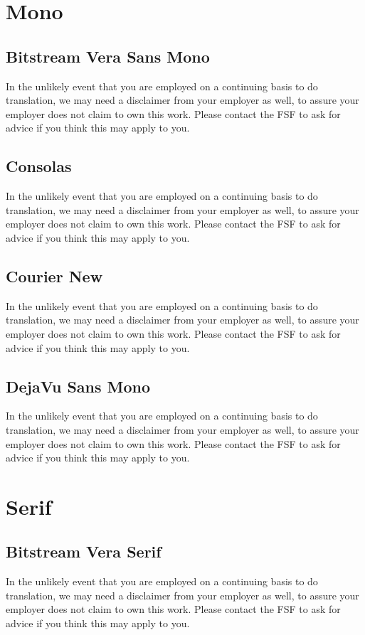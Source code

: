 \documentclass[a4paper,12pt,openany]{book}
\begin{document}
\section{Mono}
  \subsection{Bitstream Vera Sans Mono}
    In the unlikely event that you are employed on a continuing basis to do
    translation, we may need a disclaimer from your employer as well, to assure
    your employer does not claim to own this work.  Please contact the FSF to
    ask for advice if you think this may apply to you.

  \subsection{Consolas}
    In the unlikely event that you are employed on a continuing basis to do
    translation, we may need a disclaimer from your employer as well, to assure
    your employer does not claim to own this work.  Please contact the FSF to
    ask for advice if you think this may apply to you.

  \subsection{Courier New}
    In the unlikely event that you are employed on a continuing basis to do
    translation, we may need a disclaimer from your employer as well, to assure
    your employer does not claim to own this work.  Please contact the FSF to
    ask for advice if you think this may apply to you.

  \subsection{DejaVu Sans Mono}
    In the unlikely event that you are employed on a continuing basis to do
    translation, we may need a disclaimer from your employer as well, to assure
    your employer does not claim to own this work.  Please contact the FSF to
    ask for advice if you think this may apply to you.

\section{Serif}
  \subsection{Bitstream Vera Serif}
    In the unlikely event that you are employed on a continuing basis to do
    translation, we may need a disclaimer from your employer as well, to assure
    your employer does not claim to own this work.  Please contact the FSF to
    ask for advice if you think this may apply to you.
\end{document}
